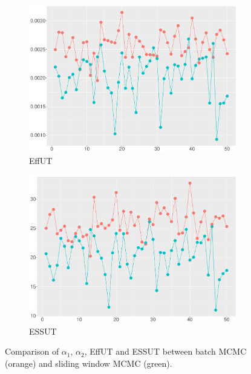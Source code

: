 \begin{figure}[h]
\begin{subfigure}[b]{0.45\textwidth}
\includegraphics[width=\textwidth]{Chapters/05MCMCOU/plots/realdatacompareeffutbatchwindow2.pdf}
	\caption{EffUT}
\end{subfigure}
\begin{subfigure}[b]{0.45\textwidth}
\includegraphics[width=\textwidth]{Chapters/05MCMCOU/plots/realdatacompareessutbatchwindow2.pdf}
	\caption{ESSUT}
\end{subfigure}
\caption{Comparison of $\alpha_1$, $\alpha_2$, EffUT and ESSUT between batch MCMC (orange) and sliding window MCMC (green). }\label{batchwindowkeyfeature}
\end{figure}

